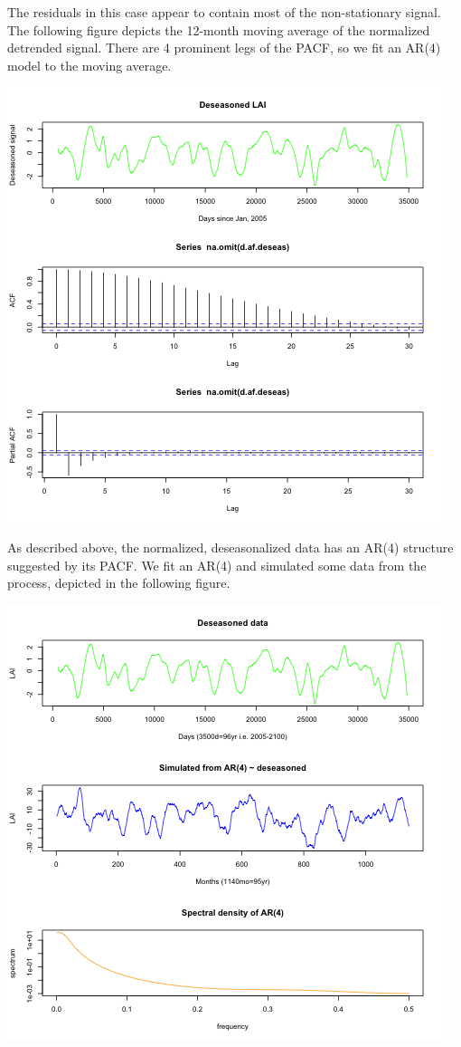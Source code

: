 \documentclass[11pt]{article}
\begin{document}
The residuals in this case appear to contain most of the non-stationary signal.
The following figure depicts the 12-month moving average of the normalized
detrended signal. There are 4 prominent legs of the PACF, so we fit an AR(4)
model to the moving average.

\includegraphics[width=\textwidth]{../img/deseasonalization.png}

As described above, the normalized, deseasonalized data has an AR(4) structure
suggested by its PACF. We fit an AR(4) and simulated some data from the process,
depicted in the following figure.

\includegraphics[width=\textwidth]{../img/ar_sim.png}
\end{document}
